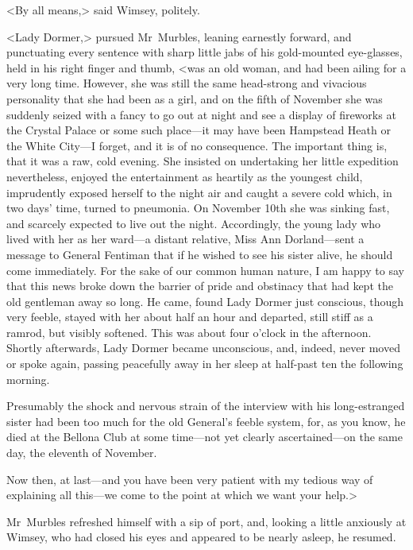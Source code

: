 <By all means,> said Wimsey, politely.

<Lady Dormer,> pursued Mr~Murbles, leaning earnestly forward, and punctuating every sentence with sharp little jabs of his gold-mounted eye-glasses, held in his right finger and thumb, <was an old woman, and had been ailing for a very long time. However, she was still the same head-strong and vivacious personality that she had been as a girl, and on the fifth of November she was suddenly seized with a fancy to go out at night and see a display of fireworks at the Crystal Palace or some such place—it may have been Hampstead Heath or the White City—I forget, and it is of no consequence. The important thing is, that it was a raw, cold evening. She insisted on undertaking her little expedition nevertheless, enjoyed the entertainment as heartily as the youngest child, imprudently exposed herself to the night air and caught a severe cold which, in two days' time, turned to pneumonia. On November  10th she was sinking fast, and scarcely expected to live out the night. Accordingly, the young lady who lived with her as her ward—a distant relative, Miss Ann Dorland—sent a message to General Fentiman that if he wished to see his sister alive, he should come immediately. For the sake of our common human nature, I am happy to say that this news broke down the barrier of pride and obstinacy that had kept the old gentleman away so long. He came, found Lady Dormer just conscious, though very feeble, stayed with her about half an hour and departed, still stiff as a ramrod, but visibly softened. This was about four o'clock in the afternoon. Shortly afterwards, Lady Dormer became unconscious, and, indeed, never moved or spoke again, passing peacefully away in her sleep at half-past ten the following morning.

Presumably the shock and nervous strain of the interview with his long-estranged sister had been too much for the old General's feeble system, for, as you know, he died at the Bellona Club at some time—not yet clearly ascertained—on the same day, the eleventh of November.

Now then, at last—and you have been very patient with my tedious way of explaining all this—we come to the point at which we want your help.>

Mr~Murbles refreshed himself with a sip of port, and, looking a little anxiously at Wimsey, who had closed his eyes and appeared to be nearly asleep, he resumed.

